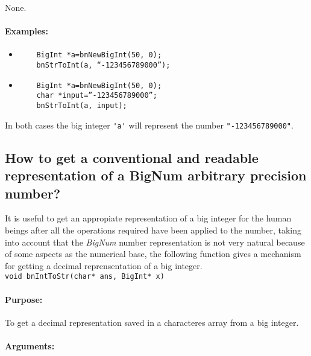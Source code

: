\documentclass{book}
\begin{document}
None.

\paragraph{Examples:}

\begin{itemize}
\item

\begin{verbatim}
	BigInt *a=bnNewBigInt(50, 0);
	bnStrToInt(a, “-123456789000”);
\end{verbatim}

\item

\begin{verbatim}
	BigInt *a=bnNewBigInt(50, 0);
	char *input=”-123456789000”;
	bnStrToInt(a, input);
\end{verbatim}
\end{itemize}

In both cases the big integer \verb+'a'+ will represent the number \verb+"-123456789000"+.

\subsection{How to get a conventional and readable representation of a BigNum arbitrary precision number?}

It is useful to get an appropiate representation of a big integer for the human beings after all the operations required have been applied to the number, taking into account that the \emph{BigNum} number representation is not very natural because of some aspects as the numerical base, the following function gives a mechanism for getting a decimal reprensentation of a big integer.\\

\verb+void bnIntToStr(char* ans, BigInt* x)+\\

\paragraph{Purpose:} 

To get a decimal representation saved in a characteres array from a big integer.

\paragraph{Arguments:}
\end{document}
